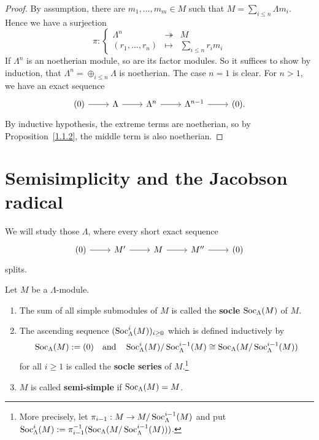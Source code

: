 
\begin{proof}
By assumption, there are $m_1,\dots,m_m\in M$ such that $M=\sum_{i\le n} \Lambda m_i$. Hence we have a surjection
\[
\pi:
\left\{
\begin{matrix}
\Lambda^n & \twoheadrightarrow & M \\
(r_1,\dots,r_n) & \mapsto & \sum_{i\le n} r_im_i
\end{matrix}
\right.
\]
If $\Lambda^n$ is an noetherian module, so are its factor modules. So it suffices to show by induction, that $\Lambda^n = \oplus_{i\le n} \Lambda$ is noetherian. The case $n=1$ is clear. For $n>1$, we have an exact sequence
\[
\begin{tikzcd}
	(0) \ar[r] & \Lambda \ar[r] & \Lambda^{n} \ar[r] & \Lambda^{n-1} \ar[r] & (0).
\end{tikzcd}
\]
By inductive hypothesis, the extreme terms are noetherian, so by Proposition~\ref{1.1.2}, the middle term is also noetherian.
\end{proof}



\section{Semisimplicity and the Jacobson radical}


We will study those $\Lambda$, where every short exact sequence
\[
\begin{tikzcd}
	(0) \ar[r] & M' \ar[r] & M \ar[r] & M'' \ar[r] & (0)
\end{tikzcd}
\]
splits.


\begin{definition}
Let $M$ be a $\Lambda$-module.
\begin{enumerate}
\item The sum of all simple submodules of $M$ is called the \textbf{socle} $\operatorname{Soc}_\Lambda(M)$ of $M$.
\item The ascending sequence $(\operatorname{Soc}^i_\Lambda(M))_{i\ge 0}$ which is defined inductively by
\[
\operatorname{Soc}_\Lambda(M):=(0)
\quad\text{and}\quad
\operatorname{Soc}_\Lambda^i(M)/\operatorname{Soc}_\Lambda^{i-1}(M)\cong \operatorname{Soc}_\Lambda(M/\operatorname{Soc}_\Lambda^{i-1}(M))
\]
for all $i\ge 1$ is called the \textbf{socle series} of $M$.\footnote{More precisely, let $\pi_{i-1}:M\to M/\operatorname{Soc}_\Lambda^{i-1}(M)$ and put $\operatorname{Soc}_\Lambda^i(M) := \pi_{i-1}^{-1}(\operatorname{Soc}_\Lambda(M/\operatorname{Soc}_\Lambda^{i-1}(M)))$.}
\item $M$ is called \textbf{semi-simple} if $\operatorname{Soc}_\Lambda(M)=M$.
\end{enumerate}
\end{definition}
